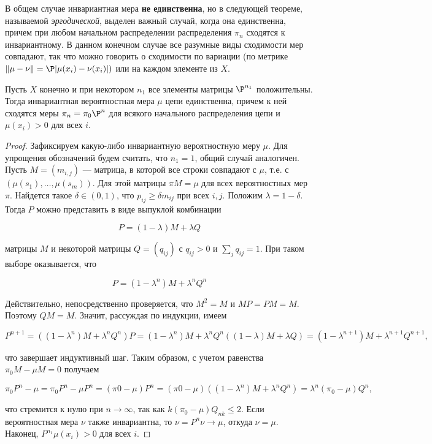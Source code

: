 В общем случае инвариантная мера \textbf{не единственна}, но в следующей теореме, называемой \textit{эргодической}, выделен важный случай, когда она единственна, причем при любом начальном распределении распределения $\pi_n$ сходятся к инвариантному. В данном конечном случае все разумные виды сходимости
мер совпадают, так что можно говорить о сходимости по вариации (по
метрике $\|\mu - \nu\| =
\P|\mu(x_i) - \nu(x_i)|)$ или на каждом элементе из $X$.

\begin{theorem}
    Пусть $X$ конечно и при некотором $n_1$ все элементы матрицы $\P^{n_1}$ положительны. Тогда инвариантная вероятностная мера $\mu$ цепи единственна, причем к ней сходятся меры $\pi_n = \pi_0\P^n$ для всякого начального распределения цепи и $\mu(x_i) > 0$ для всех $i$.
\end{theorem}

\begin{proof}
    Зафиксируем какую-либо инвариантную вероятностную меру $\mu$. Для упрощения обозначений будем считать, что $n_1 = 1$, общий случай аналогичен. Пусть $M = (m_{i,j})$ — матрица, в которой все строки совпадают с $\mu$, т.е. с $(\mu(s_1), \ldots, \mu(s_m))$. Для этой матрицы $\pi M = \mu$ для всех вероятностных мер $\pi$. Найдется такое $\delta \in (0, 1)$, что $p_{ij} \geq \delta m_{ij}$ при всех $i, j$. Положим $\lambda = 1 − \delta$. Тогда $P$ можно представить в виде выпуклой комбинации
    
    \[ P = (1 − \lambda)M + \lambda Q \]
    
    матрицы $M$ и некоторой матрицы $Q = (q_{ij} )$ с $q_{ij} > 0$ и $\sum_j q_{ij} = 1$.
    При таком выборе оказывается, что
    
    \[ P = (1 − \lambda^n)M + \lambda^n Q^n \] 
    
    Действительно, непосредственно проверяется, что $M^2 = M$ и $MP = PM = M$.
    Поэтому $QM = M$. Значит, рассуждая по индукции, имеем
    
    \[ P^{n+1} = ((1- \lambda^n) M + \lambda^n Q^n)P=(1-\lambda^n)M+\lambda^n Q^n ((1 - \lambda)M + \lambda Q)=(1-\lambda^{n+1})M+\lambda^{n+1}Q^{n+1}, \]
    
    что завершает индуктивный шаг. Таким образом, с учетом равенства $\pi_0 M − \mu M = 0$ получаем
    
    \[ \pi_0 P^n−\mu = \pi_0 P^n−\mu P^n = (\pi0−\mu)P^n = (\pi0−\mu)((1−\lambda^n)M +\lambda^n Q^n) = \lambda^n (\pi_0 − \mu)Q^n, \] 
    
    что стремится к нулю при $n \to \infty$, так как $k(\pi_0 − \mu)Q_{nk} \leq 2$. Если вероятностная мера $\nu$ также инвариантна, то $\nu = P^n \nu \to \mu$, откуда $\nu = \mu$. Наконец, $P^{n_1} \mu(x_i) > 0$ для всех $i$.
\end{proof}

